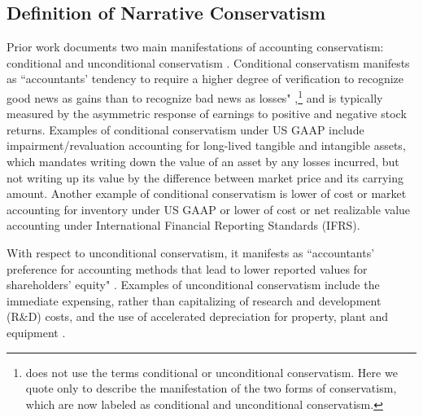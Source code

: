 \documentclass[letterpaper,12pt]{article}
\begin{document}
\begin{spacing}{1.5}
\subsection{Definition of Narrative Conservatism}\label{sec2.1}
\noindent Prior work documents two main manifestations of accounting conservatism: conditional and unconditional conservatism \cite{beaverConditionalUnconditionalConservatism2005}. Conditional conservatism manifests as ``accountants' tendency to require a higher degree of verification to recognize good news as gains than to recognize bad news as losses" \cite[p. 7]{basuConservatismPrincipleAsymmetric1997},\footnote{ does not use the terms conditional or unconditional conservatism. Here we quote  only to describe the manifestation of the two forms of conservatism, which are now labeled as conditional and unconditional conservatism.} and is typically measured by the asymmetric response of earnings to positive and negative stock returns. Examples of conditional conservatism under US GAAP include impairment/revaluation accounting for long-lived tangible and intangible assets, which mandates writing down the value of an asset by any losses incurred, but not writing up its value by the difference between market price and its carrying amount. Another example of conditional conservatism is lower of cost or market accounting for inventory under US GAAP or lower of cost or net realizable value accounting under International Financial Reporting Standards (IFRS). 

With respect to unconditional conservatism, it manifests as ``accountants' preference for accounting methods that lead to lower reported values for shareholders' equity" \cite[p. 8]{basuConservatismPrincipleAsymmetric1997}. Examples of unconditional conservatism include the immediate expensing, rather than capitalizing of research and development (R\&D) costs, and the use of accelerated depreciation for property, plant and equipment \cite{beaverConditionalUnconditionalConservatism2005}. 


\end{spacing}
\end{document}

